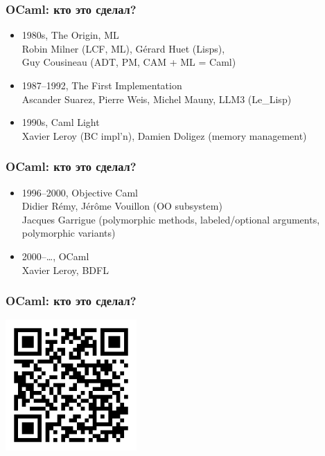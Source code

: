 \begin{frame}
  \frametitle{OCaml: кто это сделал?}

  \begin{itemize}
    \Large
    \item 1980s, The Origin, ML\\
    \normalsize
    Robin Milner (LCF, ML), G\'{e}rard Huet (Lisps),\\
    Guy Cousineau (ADT, PM, CAM + ML = Caml) \pause
    \Large
    \item 1987--1992, The First Implementation\\
    \normalsize
    Ascander Suarez, Pierre Weis, Michel Mauny, LLM3 (Le\_Lisp) \pause
    \Large
    \item 1990s, Caml Light\\
    \normalsize
    Xavier Leroy (BC impl'n), Damien Doligez (memory management)
  \end{itemize}
\end{frame}

\begin{frame}
  \frametitle{OCaml: кто это сделал?}

  \begin{itemize}
    \Large
    \item 1996--2000, Objective Caml\\
    \normalsize
    Didier R\'{e}my,  J\'{e}r\^{o}me Vouillon (OO subsystem)\\
    Jacques Garrigue (polymorphic methods, labeled/optional arguments, polymorphic variants) \pause
    \Large
    \item 2000--\dots, OCaml\\
    \normalsize
    Xavier Leroy, BDFL
  \end{itemize}
\end{frame}

\begin{frame}
  \frametitle{OCaml: кто это сделал?}

  \vspace{5mm}
  \begin{center}
    \includegraphics[width=5cm,keepaspectratio]{./images/qr-ocaml-history.png}
  \end{center}
\end{frame}

